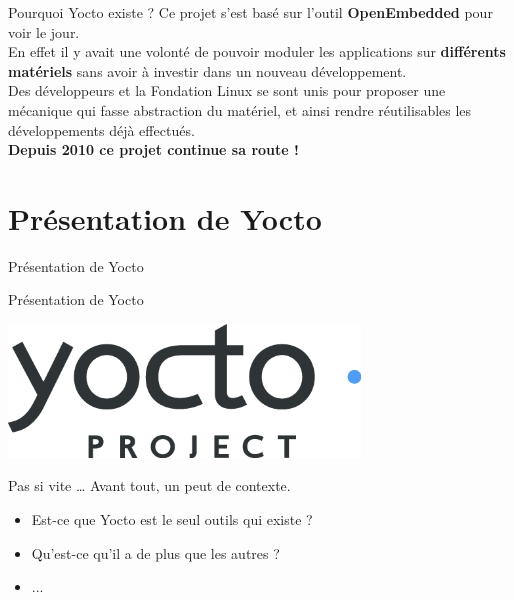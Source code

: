 \documentclass[compress]{smilebeamer}
\begin{document}
\begin{frame}
\begin{block}{Pourquoi Yocto existe ?}
	Ce projet s'est basé sur l'outil \textbf{OpenEmbedded} pour voir le jour.\newline{}\\
	En effet il y avait une volonté de pouvoir moduler les applications sur
	\textbf{différents matériels} sans avoir à investir dans un nouveau développement.
	\newline{}\\
	Des développeurs et la Fondation Linux se sont unis pour proposer	une 
	mécanique qui fasse abstraction du matériel, et ainsi rendre réutilisables
	les développements déjà effectués.\newline{}\\
	\textbf{Depuis 2010 ce projet continue sa route !}
\end{block}
\end{frame}


\section{Présentation de Yocto}

\begin{frame}{Présentation de Yocto}
\end{frame}

\begin{frame}{Présentation de Yocto}
\begin{center}
\includegraphics[width=0.7\textwidth]{logos/yocto-project-transp.png}
\end{center}
\end{frame}

\begin{frame}{Pas si vite …}
Avant tout, un peut de contexte.\newline
\newline
\begin{itemize}
	\item Est-ce que Yocto est le seul outils qui existe ?
	\item Qu'est-ce qu'il a de plus que les autres ?
	\item ...
\end{itemize}
\end{frame}
\end{document}
